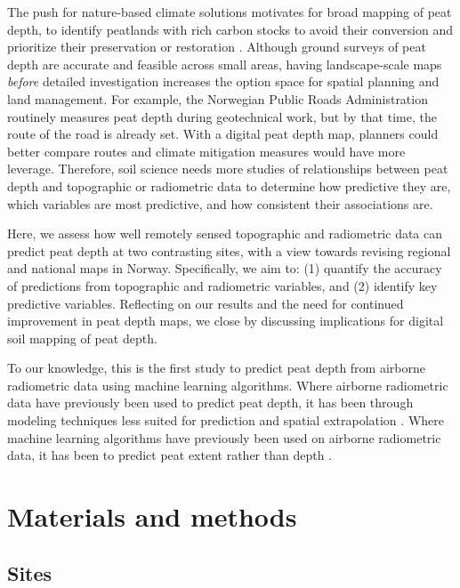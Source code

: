 \documentclass[soil, manuscript]{copernicus}
\begin{document}
The push for nature-based climate solutions motivates for broad mapping of peat depth, to identify peatlands with rich carbon stocks to avoid their conversion and prioritize their preservation or restoration \citep{strackPotentialPeatlandsNatureBased2022}.
Although ground surveys of peat depth are accurate and feasible across small areas, having landscape-scale maps \emph{before} detailed investigation increases the option space for spatial planning and land management.
For example, the Norwegian Public Roads Administration routinely measures peat depth during geotechnical work, but by that time, the route of the road is already set.
With a digital peat depth map, planners could better compare routes and climate mitigation measures would have more leverage.
Therefore, soil science needs more studies of relationships between peat depth and topographic or radiometric data to determine how predictive they are, which variables are most predictive, and how consistent their associations are.

Here, we assess how well remotely sensed topographic and radiometric data can predict peat depth at two contrasting sites, with a view towards revising regional and national maps in Norway.
Specifically, we aim to: (1) quantify the accuracy of predictions from topographic and radiometric variables, and (2) identify key predictive variables.
Reflecting on our results and the need for continued improvement in peat depth maps, we close by discussing implications for digital soil mapping of peat depth.

To our knowledge, this is the first study to predict peat depth from airborne radiometric data using machine learning algorithms.
Where airborne radiometric data have previously been used to predict peat depth, it has been through modeling techniques less suited for prediction and spatial extrapolation \citep[e.g.,][]{keaneySpatialStatisticsEstimate2013, gatisMappingUplandPeat2019, siemonAirborneElectromagneticRadiometric2020}.
Where machine learning algorithms have previously been used on airborne radiometric data, it has been to predict peat extent rather than depth \citep[e.g.,][]{olearyDigitalSoilMapping2022}.

\section{Materials and methods}

\subsection{Sites}
\end{document}
